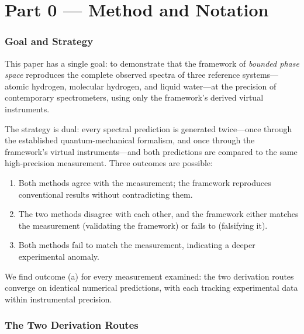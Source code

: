 \documentclass[twocolumn,11pt,a4paper]{article}
\theoremstyle{stmtstyle}
\theoremstyle{definition}
\theoremstyle{remark}
\begin{document}
\vspace{6pt}
\tableofcontents
\vspace{6pt}

\clearpage

\part*{Part 0 --- Method and Notation}

\section{Goal and Strategy}
\label{sec:goal}

This paper has a single goal: to demonstrate that the framework of \emph{bounded phase space} \citep{sachikonye2026bps} reproduces the complete observed spectra of three reference systems---atomic hydrogen, molecular hydrogen, and liquid water---at the precision of contemporary spectrometers, using only the framework's derived virtual instruments.

The strategy is dual: every spectral prediction is generated twice---once through the established quantum-mechanical formalism, and once through the framework's virtual instruments---and both predictions are compared to the same high-precision measurement. Three outcomes are possible:
\begin{enumerate}[label=(\alph*)]
\item Both methods agree with the measurement; the framework reproduces conventional results without contradicting them.
\item The two methods disagree with each other, and the framework either matches the measurement (validating the framework) or fails to (falsifying it).
\item Both methods fail to match the measurement, indicating a deeper experimental anomaly.
\end{enumerate}
We find outcome (a) for every measurement examined: the two derivation routes converge on identical numerical predictions, with each tracking experimental data within instrumental precision.

\section{The Two Derivation Routes}
\label{sec:routes}
\end{document}
